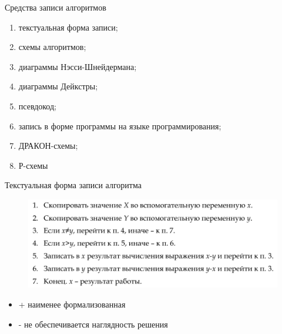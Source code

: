 \documentclass{beamer}
\begin{document}
\begin{frame}
Средства записи алгоритмов
\begin{enumerate}
\item текстуальная форма записи;
\item схемы алгоритмов;
\item диаграммы Нэсси-Шнейдермана;
\item диаграммы Дейкстры;
\item псевдокод;
\item запись в форме программы на языке программирования;
\item ДРАКОН-схемы;
\item Р-схемы
\end{enumerate}
\end{frame}

\begin{frame}
\begin{block}{Текстуальная форма записи алгоритма}
\begin{figure}[h]
\centering
\includegraphics[scale=0.45]{images/lec01-pic01.png}
\end{figure}
\end{block}
\begin{itemize}
\item + наименее формализованная
\item - не обеспечивается наглядность решения
\end{itemize}
\end{frame}
\end{document}
